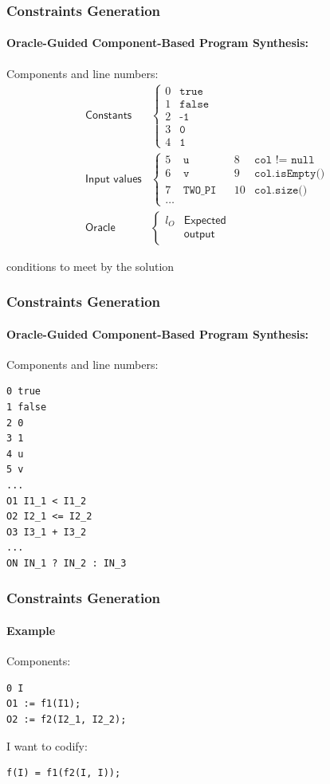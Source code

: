 \documentclass[onlymath]{beamer}
\begin{document}
\begin{frame}
  \frametitle{Constraints Generation}
  \framesubtitle{Oracle-Guided Component-Based Program Synthesis:}
  Components and line numbers:
\begin{align*}
\textsf{Constants} & \left\{ \begin{array}{ll}
        0 & \texttt{true} \\
        1 & \texttt{false} \\
        2 & \texttt{-1} \\
        3 & \texttt{0} \\
        4 & \texttt{1}
    \end{array}\right. \\
\textsf{Input values} & \left\{ \begin{array}{lllll}
        5 & \texttt{u} & &		8 & \texttt{col != null} \\
        6 & \texttt{v} & &		9 & \texttt{col.isEmpty()} \\
        7 & \texttt{TWO\_PI} & &	10 & \texttt{col.size()} \\
        \dots
    \end{array}\right. \\
\textsf{Oracle} & \left\{ \begin{array}{ll}
        l_O &  \textsf{Expected} \\
            & \textsf{output}
    \end{array}\right.
\end{align*}
\end{frame}

\begin{frame}
conditions to meet by the solution
\end{frame}

\begin{frame}[fragile]
  \frametitle{Constraints Generation}
  \framesubtitle{Oracle-Guided Component-Based Program Synthesis:}
  Components and line numbers:
\begin{verbatim}
0 true
1 false
2 0
3 1
4 u
5 v
...
O1 I1_1 < I1_2
O2 I2_1 <= I2_2
O3 I3_1 + I3_2
...
ON IN_1 ? IN_2 : IN_3
\end{verbatim}
\end{frame}

\begin{frame}[fragile]
  \frametitle{Constraints Generation}
  \framesubtitle{Example}
  Components:
\begin{verbatim}
0 I
O1 := f1(I1);
O2 := f2(I2_1, I2_2);
\end{verbatim}
I want to codify:
\begin{verbatim}
f(I) = f1(f2(I, I));
\end{verbatim}
\end{frame}
\end{document}
